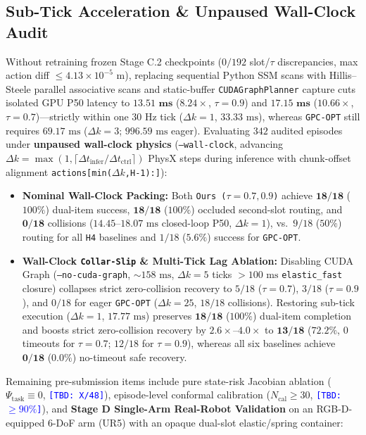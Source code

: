 \documentclass[letterpaper, 10pt, conference]{ieeeconf}
\newcommand{\tbd}[1]{\textcolor{blue}{\texttt{[TBD: #1]}}}
\begin{document}
\subsection{Sub-Tick Acceleration \& Unpaused Wall-Clock Audit}
Without retraining frozen Stage C.2 checkpoints ($0/192$ slot/$\tau$ discrepancies, max action diff $\le 4.13\times 10^{-5}\text{ m}$), replacing sequential Python SSM scans with Hillis--Steele parallel associative scans and static-buffer \texttt{CUDAGraphPlanner} capture cuts isolated GPU P50 latency to $\mathbf{13.51\text{ ms}}$ ($8.24\times$, \texttt{$\tau=0.9$}) and $\mathbf{17.15\text{ ms}}$ ($10.66\times$, \texttt{$\tau=0.7$})---strictly within one $30\text{ Hz}$ tick ($\Delta k = 1$, $33.33\text{ ms}$), whereas \texttt{GPC-OPT} still requires $69.17\text{ ms}$ ($\Delta k = 3$; $996.59\text{ ms}$ eager). Evaluating $342$ audited episodes under \textbf{unpaused wall-clock physics} (\texttt{--wall-clock}, advancing $\Delta k = \max(1,\lceil \Delta t_{\text{infer}}/\Delta t_{\text{ctrl}}\rceil)$ PhysX steps during inference with chunk-offset alignment \texttt{actions[min($\Delta k$,H-1):]}):
\begin{itemize}
    \item \textbf{Nominal Wall-Clock Packing:} Both \texttt{Ours ($\tau=0.7, 0.9$)} achieve $\mathbf{18/18}$ ($100\%$) dual-item success, $\mathbf{18/18}$ ($100\%$) occluded second-slot routing, and $\mathbf{0/18}$ collisions ($14.45\text{--}18.07\text{ ms}$ closed-loop P50, $\Delta k=1$), vs.\ $9/18$ ($50\%$) routing for all \texttt{H4} baselines and $1/18$ ($5.6\%$) success for \texttt{GPC-OPT}.
    \item \textbf{Wall-Clock \texttt{Collar-Slip} \& Multi-Tick Lag Ablation:} Disabling CUDA Graph (\texttt{--no-cuda-graph}, $\sim 158\text{ ms}$, $\Delta k = 5$ ticks $> 100\text{ ms}$ \texttt{elastic\_fast} closure) collapses strict zero-collision recovery to $5/18$ (\texttt{$\tau=0.7$}), $3/18$ (\texttt{$\tau=0.9$}), and $0/18$ for eager \texttt{GPC-OPT} ($\Delta k=25$, $18/18$ collisions). Restoring sub-tick execution ($\Delta k=1$, $17.77\text{ ms}$) preserves $\mathbf{18/18}$ ($100\%$) dual-item completion and boosts strict zero-collision recovery by $\mathbf{2.6\times\text{--}4.0\times}$ to $\mathbf{13/18}$ ($72.2\%$, $0$ timeouts for \texttt{$\tau=0.7$}; $12/18$ for \texttt{$\tau=0.9$}), whereas all six baselines achieve $\mathbf{0/18}$ ($0.0\%$) no-timeout safe recovery.
\end{itemize}
Remaining pre-submission items include pure state-risk Jacobian ablation ($\Psi_{\text{task}} \equiv 0$, \tbd{X/48}), episode-level conformal calibration ($N_{\text{cal}} \ge 30$, \tbd{$\ge 90\%$}), and \textbf{Stage D Single-Arm Real-Robot Validation} on an RGB-D-equipped 6-DoF arm (UR5) with an opaque dual-slot elastic/spring container:
\end{document}
